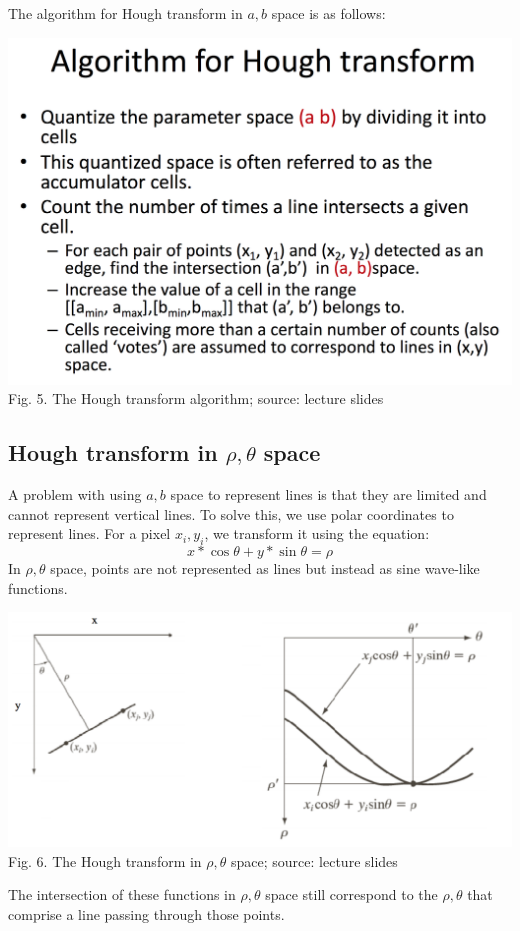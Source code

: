 \documentclass{article}
\begin{document}
The algorithm for Hough transform in $a,b$ space is as follows:

\includegraphics[width=\textwidth]{hough_transform3.png}
Fig. 5. The Hough transform algorithm; source: lecture slides

\subsection{Hough transform in $\rho, \theta$ space}
A problem with using $a,b$ space to represent lines is that they are limited and cannot represent vertical lines.
To solve this, we use polar coordinates to represent lines. For a pixel $x_i, y_i$, we transform it using the equation:
$$ x*\cos\theta + y*\sin\theta = \rho$$
In $\rho, \theta$ space, points are not represented as lines but instead as sine wave-like functions.

\includegraphics[width=\textwidth]{hough_transform4.png}
Fig. 6. The Hough transform in $\rho, \theta$ space; source: lecture slides

The intersection of these functions in $\rho, \theta$ space still correspond to the $\rho, \theta$ that comprise a line passing through those points.
\end{document}

